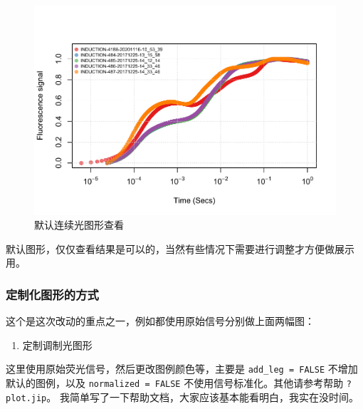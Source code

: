 \documentclass[
]{krantz}
\providecommand{\tightlist}{%
  \setlength{\itemsep}{0pt}\setlength{\parskip}{0pt}}
\begin{document}
\begin{figure}
\centering
\includegraphics{bookdown_files/figure-latex/default-moulation-plot-dc-1.pdf}
\caption{\label{fig:default-moulation-plot-dc}默认连续光图形查看}
\end{figure}

默认图形，仅仅查看结果是可以的，当然有些情况下需要进行调整才方便做展示用。

\hypertarget{customized-plot-jiptest}{%
\subsubsection{定制化图形的方式}\label{customized-plot-jiptest}}

这个是这次改动的重点之一，例如都使用原始信号分别做上面两幅图：

\begin{enumerate}
\def\labelenumi{\arabic{enumi}.}
\tightlist
\item
  定制调制光图形
\end{enumerate}

这里使用原始荧光信号，然后更改图例颜色等，主要是 \texttt{add\_leg\ =\ FALSE} 不增加默认的图例，以及 \texttt{normalized\ =\ FALSE} 不使用信号标准化。其他请参考帮助 \texttt{?plot.jip}。 我简单写了一下帮助文档，大家应该基本能看明白，我实在没时间。
\end{document}
